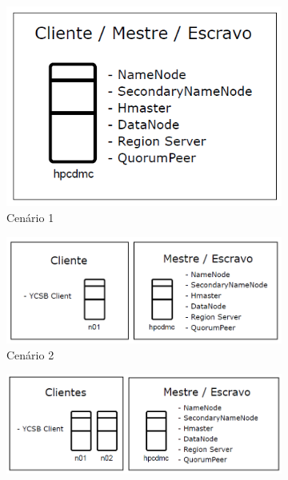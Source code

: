 \documentclass[12pt]{article}
\begin{document}
\begin{figure}
	\centering
	\hspace{0.2cm}
    \begin{subfigure}{0.2\textwidth}
    	\centering
        \includegraphics[width=1.0\textwidth]{images/cenario-1.png}
        \caption{Cenário 1}
        \label{figura2a}
    \end{subfigure}
    \hspace{0.3cm}
    \begin{subfigure}{0.3\textwidth}   
    	\centering
        \includegraphics[width=1.1\textwidth]{images/cenario-2.png}
        \caption{Cenário 2}%
        \label{figura2b}
    \end{subfigure}
    \hspace{0.4cm}
    \begin{subfigure}{0.3\textwidth}
    	\centering
        \includegraphics[width=1.1\textwidth]{images/cenario-3.png}

\end{subfigure}
\end{figure}
\end{document}
